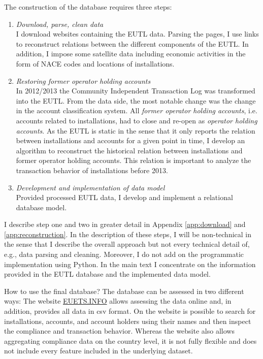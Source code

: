 \documentclass[authoryear]{elsarticle}
\begin{document}
The construction of the database requires three steps:
\begin{enumerate}
	\item \textit{Download, parse, clean data}\\ I download websites containing the EUTL data. Parsing the pages, I use links to reconstruct relations between the different components of the EUTL. In addition, I impose some satellite data including economic activities in the form of NACE codes and locations of installations.   
	\item \textit{Restoring former operator holding accounts}\\ In 2012/2013 the Community Independent Transaction Log was transformed into the EUTL. From the data side, the most notable change was the change in the account classification system. All \textit{former operator holding accounts}, i.e. accounts related to installations, had to close and re-open as \textit{operator holding accounts}. As the EUTL is static in the sense that it only reports the relation between installations and accounts for a given point in time, I develop an algorithm to reconstruct the historical relation between installations and former operator holding accounts. This relation is important to analyze the transaction behavior of installations before 2013. 
	\item \textit{Development and implementation of data model}\\ Provided processed EUTL data, I develop and implement a relational database model. 
\end{enumerate} 

I describe step one and two in greater detail in Appendix \ref{app:download} and \ref{app:reconstruction}. In the description of these steps, I will be non-technical in the sense that I describe the overall approach but not every technical detail of, e.g., data parsing and cleaning. Moreover, I do not add on the programmatic implementation using Python. In the main text I concentrate on the information provided in the EUTL database and the implemented data model. 

How to use the final database? The database can be assessed in two different ways: The website \url{EUETS.INFO} allows assessing the data online and, in addition, provides all data in csv format. On the website is possible to search for installations, accounts, and account holders using their names and then inspect the compliance and transaction behavior. Whereas the website also allows aggregating compliance data on the country level, it is not fully flexible and does not include every feature included in the underlying dataset. 
\end{document}
